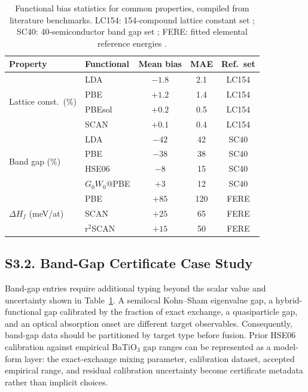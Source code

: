\documentclass[onecolumn,superscriptaddress,amsmath,amssymb,longbibliography]{revtex4-2}
\begin{document}
\begin{table}[h]
\centering
\caption{Functional bias statistics for common properties, compiled from
literature benchmarks. LC154: 154-compound lattice constant set
\cite{Lejaeghere2016}; SC40: 40-semiconductor band gap
set \cite{Crowley2016}; FERE: fitted elemental reference
energies \cite{Stevanovic2012_FERE}.}
\label{tab:si_functional_bias}
\begin{tabular}{llccc}
\toprule
Property & Functional & Mean bias & MAE & Ref.\ set \\
\midrule
\multirow{4}{*}{Lattice const.\ (\%)}
    & LDA & $-1.8$ & 2.1 & LC154 \\
    & PBE & $+1.2$ & 1.4 & LC154 \\
    & PBEsol & $+0.2$ & 0.5 & LC154 \\
    & SCAN & $+0.1$ & 0.4 & LC154 \\
\midrule
\multirow{4}{*}{Band gap (\%)}
    & LDA & $-42$ & 42 & SC40 \\
    & PBE & $-38$ & 38 & SC40 \\
    & HSE06 & $-8$ & 15 & SC40 \\
    & $G_0W_0$@PBE & $+3$ & 12 & SC40 \\
\midrule
\multirow{3}{*}{$\Delta H_f$ (meV/at)}
    & PBE & $+85$ & 120 & FERE \\
    & SCAN & $+25$ & 65 & FERE \\
    & r$^2$SCAN & $+15$ & 50 & FERE \\
\bottomrule
\end{tabular}
\end{table}

\subsection{S3.2. Band-Gap Certificate Case Study}
\label{sec:si_band_gap_certificate}

Band-gap entries require additional typing beyond the scalar value and
uncertainty shown in Table~\ref{tab:si_functional_bias}. A semilocal
Kohn--Sham eigenvalue gap, a hybrid-functional gap calibrated by the fraction
of exact exchange, a quasiparticle gap, and an optical absorption onset are
different target observables. Consequently, band-gap data should be partitioned
by target type before fusion. Prior HSE06 calibration against empirical
BaTiO$_3$ gap ranges can be represented as a model-form layer: the
exact-exchange mixing parameter, calibration dataset, accepted empirical
range, and residual calibration uncertainty become certificate metadata rather
than implicit choices.
\end{document}
